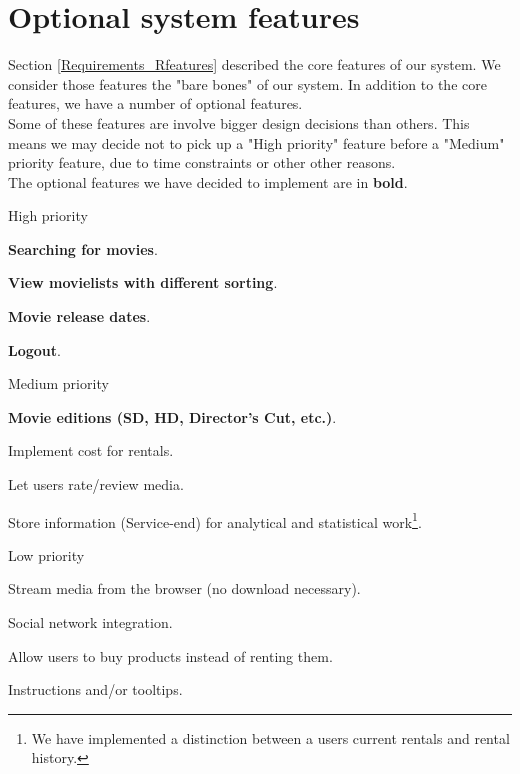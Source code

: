 \section{Optional system features}
\label{Requirements_Ofeatures}
Section \ref{Requirements_Rfeatures} described the core features of our system. We consider those features the "bare bones" of our system. In addition to the core features, we have a number of optional features. 
\\Some of these features are involve bigger design decisions than others. This means we may decide not to pick up a "High priority" feature before a "Medium" priority feature, due to time constraints or other other reasons.
\\The optional features we have decided to implement are in \textbf{bold}.
\begin{my_itemize}
	\item High priority
	\begin{my_itemize}
		\item \textbf{Searching for movies}.
		\item \textbf{View movielists with different sorting}.
		\item \textbf{Movie release dates}.
		\item \textbf{Logout}.
	\end{my_itemize}
	\item Medium priority
	\begin{my_itemize}
		\item \textbf{Movie editions (SD, HD, Director's Cut, etc.)}.
		\item Implement cost for rentals.
		\item Let users rate/review media.
		\item Store information (Service-end) for analytical and statistical work\footnote{We have implemented a distinction between a users current rentals and rental history.}.
	\end{my_itemize}
	\item Low priority
	\begin{my_itemize}
		\item Stream media from the browser (no download necessary).
		\item Social network integration.
		\item Allow users to buy products instead of renting them.
		\item Instructions and/or tooltips.
	\end{my_itemize}
\end{my_itemize}

